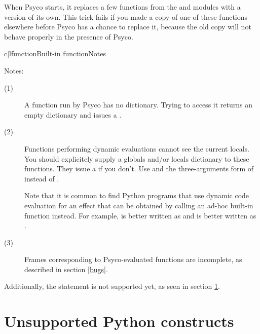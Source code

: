 \documentclass{manual}
\begin{document}
When Psyco starts, it replaces a few functions from the  and  modules with a version of its own.  This trick fails if you made a copy of one of these functions elsewhere before Psyco has a chance to replace it, because the old copy will not behave properly in the presence of Psyco.

%
\begin{tableii}{c|l}{function}{Built-in function}{Notes}
\end{tableii}

\noindent
Notes:
%
\begin{description}
\item[(1)]
  A function run by Psyco has no  dictionary.  Trying to access it returns an empty dictionary and issues a .
\item[(2)]
  Functions performing dynamic evaluations cannot see the current locals.  You should explicitely supply a globals and/or locals dictionary to these functions.  They issue a  if you don't.  Use  and the three-arguments form of  instead of .

  Note that it is common to find Python programs that use dynamic code evaluation for an effect that can be obtained by calling an ad-hoc built-in function instead.  For example,  is better written as  and  is better written as .
\item[(3)]
  Frames corresponding to Psyco-evaluated functions are incomplete, as described in section \ref{bugs}.
\end{description}

Additionally, the  statement is not supported yet, as seen in section \ref{unsupported}.


\section{Unsupported Python constructs}\label{unsupported}
\end{document}
